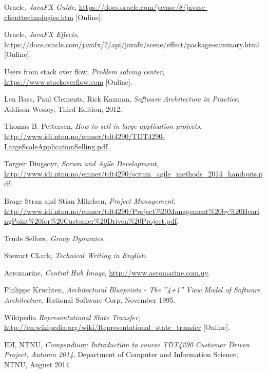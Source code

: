 \documentclass[../document]{subfiles}
\begin{document}
\begin{thebibliography}{1}
\label{Bibliography}


Oracle,
{\em JavaFX Guide},
\url{https://docs.oracle.com/javase/8/javase-clienttechnologies.htm} [Online].

Oracle,
{\em JavaFX Effects},
\url{https://docs.oracle.com/javafx/2/api/javafx/scene/effect/package-summary.html} [Online].

Users from stack over flow, 
{\em Problem solving center},
\url{https://www.stackoverflow.com} [Online].

Len Bass, Paul Clements, Rick Kazman,
{\em Software Architecture in Practice}.
Addison-Wesley,
Third Edition,
2012.

Thomas B. Pettersen, 
{\em How to sell in large application projects},
\url{http://www.idi.ntnu.no/emner/tdt4290/TDT4290-LargeScaleApplicationSelling.pdf}.

Torgeir Dingsoyr, 
{\em Scrum and Agile Development},
\url{http://www.idi.ntnu.no/emner/tdt4290/scrum_agile_methods_2014_handouts.pdf}.

Brage Stran and Stian Mikelsen, 
{\em Project Management},
\url{http://www.idi.ntnu.no/emner/tdt4290/Project%20Management%20by%20BearingPoint%20for%20Customer%20Driven%20Project.pdf}.

Trude Selfors, 
{\em Group Dynamics}.

Stewart CLark, 
{\em Technical Writing in English}.

Aeromarine,
{\em Central Hub Image},
\url{http://www.aeromarine.com.uy}.


 Philippe Kruchten, {\em Architectural Blueprints - The ''4+1'' View Model of Software Architecture}, Rational Software Corp, November 1995.

Wikipedia {\em Representational State Transfer}, \url{http://en.wikipedia.org/wiki/Representational_state_transfer} [Online].

 IDI, NTNU, {\em Compendium: Introduction to course TDT4290 Customer Driven Project, Autumn 2014}, Department of Computer and Information Science, NTNU,  August 2014.


\end{thebibliography}
\end{document}
